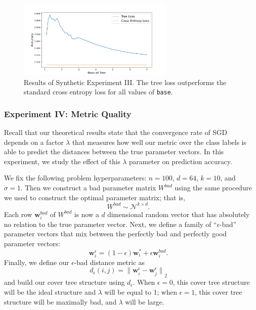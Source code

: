 \documentclass[twoside]{article}
\newcommand{\bad}[1]{{#1}^{\textit{bad}}}
\newcommand{\w}{\mathbf w}
\newcommand{\ltwo}[1]{{\lVert {#1} \rVert}_2}
\begin{document}

\begin{figure}
\includegraphics[width=\columnwidth,height=1.5in]{fig/new_img/accuracy_vs_base.png}
\caption
{
    Results of Synthetic Experiment III.
    The tree loss outperforms the standard cross entropy loss for all values of \texttt{base}.
}
\label{fig:ct:acc}
\end{figure}



\subsubsection{Experiment IV: Metric Quality}
\label{sec:synth:eps}

Recall that our theoretical results state that the convergence rate of SGD depends on a factor $\lambda$ that measures how well our metric over the class labels is able to predict the distances between the true parameter vectors.
In this experiment, we study the effect of this $\lambda$ parameter on prediction accuracy.

We fix the following problem hyperparameters:
$n=100$, $d=64$, $k=10$, and $\sigma=1$.
Then we construct a bad parameter matrix $\bad W$ using the same procedure we used to construct the optimal parameter matrix;
that is,
\begin{equation}
    \bad W \sim \mathcal N ^ {k\times d}
    .
\end{equation}
Each row $\bad \w_i$ of $\bad W$ is now a $d$ dimensional random vector that has absolutely no relation to the true parameter vector.
Next, we define a family of ``$\epsilon$-bad'' parameter vectors that mix between the perfectly bad and perfectly good parameter vectors:
\begin{equation}
    \w^\epsilon_i = (1-\epsilon) \w^*_i + \epsilon \bad\w_i.
\end{equation}
Finally, we define our $\epsilon$-bad distance metric as
\begin{equation}
    d_\epsilon(i,j) = \ltwo{\w_i^\epsilon - \w_j^\epsilon}
\end{equation}
and build our cover tree structure using $d_\epsilon$.
When $\epsilon=0$, this cover tree structure will be the ideal structure and $\lambda$ will be equal to 1;
when $\epsilon=1$, this cover tree structure will be maximally bad, and $\lambda$ will be large.
\end{document}
